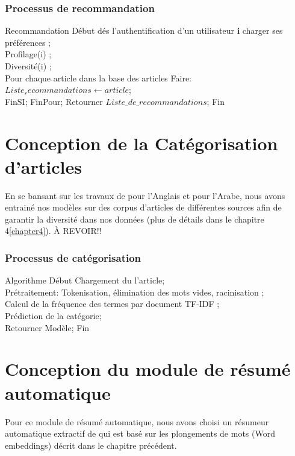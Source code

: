 \subsubsection{Processus de recommandation}
\begin{algorithm}
	\begin{algorithmic}[1]
		\STATE Recommandation
		\STATE Début
		\STATE dés l'authentification d'un utilisateur \textbf{i} charger ses préférences ;\\
		\STATE Profilage(i) ;\\
		\STATE Diversité(i) ;\\
		\STATE Pour chaque article dans la base des articles Faire:
		$Liste_recommandations \gets article$;\\
		\STATE FinSI;
		\STATE FinPour;
		\STATE \quad Retourner $Liste\_de\_recommandations$;
		\STATE Fin
	\end{algorithmic}
\end{algorithm}

\section{Conception de la Catégorisation d'articles}
En se bansant sur les travaux de \cite{categorisation} pour l'Anglais et \cite{categorisation} pour l'Arabe, nous avons entrainé nos modèles sur des corpus d'articles de différentes sources afin de garantir la diversité dans nos données (plus de détails dans le chapitre 4\ref{chapter4}).
À REVOIR!!
\subsubsection{Processus de catégorisation}
    \begin{algorithm}
        \begin{algorithmic}[1]
        \STATE Algorithme
        \STATE Début
        \STATE Chargement du l'article;\\
        \STATE Prétraitement: Tokenisation, élimination des mots vides, racinisation ;\\
        \STATE Calcul de la fréquence des termes par document TF-IDF ;\\
        \STATE Prédiction de la catégorie;\\
        \STATE \quad Retourner Modèle;
        \STATE Fin
        \end{algorithmic}
    \end{algorithm}


\section{Conception du module de résumé automatique}
Pour ce module de résumé automatique, nous avons choisi un résumeur automatique extractif de \cite{notrerésumé} qui est basé sur les plongements de mots (Word embeddings) décrit dans le chapitre précédent.

